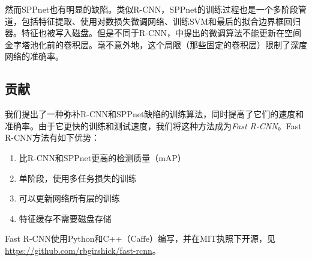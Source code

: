 \documentclass[../main]{subfile}
\begin{document}
然而SPPnet也有明显的缺陷。类似R-CNN，SPPnet的训练过程也是一个多阶段管道，包括特征提取、使用对数损失微调网络、训练SVM和最后的拟合边界框回归器。特征也被写入磁盘。但是不同于R-CNN，\cite{spp}中提出的微调算法不能更新在空间金字塔池化前的卷积层。毫不意外地，这个局限（那些固定的卷积层）限制了深度网络的准确率。

\subsection{贡献}

我们提出了一种弥补R-CNN和SPPnet缺陷的训练算法，同时提高了它们的速度和准确率。由于它更快的训练和测试速度，我们将这种方法成为\textit{Fast R-CNN}。Fast R-CNN方法有如下优势：
\begin{enumerate}
    \item 比R-CNN和SPPnet更高的检测质量（mAP）
    \item 单阶段，使用多任务损失的训练
    \item 可以更新网络所有层的训练
    \item 特征缓存不需要磁盘存储
\end{enumerate}

Fast R-CNN使用Python和C++（Caffe）编写，并在MIT执照下开源，见\href{https://github.com/rbgirshick/fast-rcnn}{https://github.com/rbgirshick/fast-rcnn}。
\end{document}
